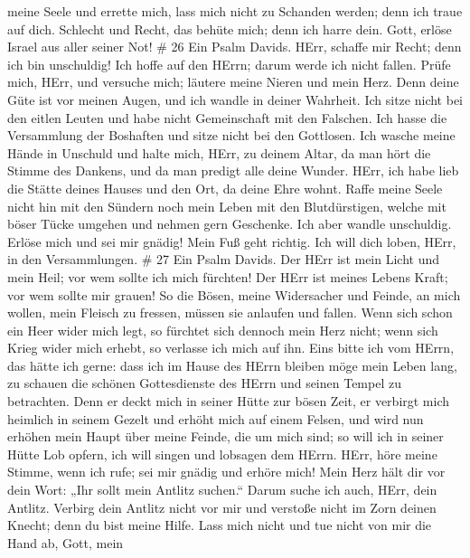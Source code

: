 meine Seele und errette mich, lass mich nicht zu Schanden werden; denn
ich traue auf dich.  Schlecht und Recht, das behüte mich;
denn ich harre dein.  Gott, erlöse Israel aus aller seiner
Not! \# 26  Ein Psalm Davids. HErr, schaffe mir Recht; denn
ich bin unschuldig! Ich hoffe auf den HErrn; darum werde ich nicht
fallen.  Prüfe mich, HErr, und versuche mich; läutere meine
Nieren und mein Herz.  Denn deine Güte ist vor meinen Augen,
und ich wandle in deiner Wahrheit.  Ich sitze nicht bei den
eitlen Leuten und habe nicht Gemeinschaft mit den Falschen. 
Ich hasse die Versammlung der Boshaften und sitze nicht bei den
Gottlosen.  Ich wasche meine Hände in Unschuld und halte
mich, HErr, zu deinem Altar,  da man hört die Stimme des
Dankens, und da man predigt alle deine Wunder.  HErr, ich
habe lieb die Stätte deines Hauses und den Ort, da deine Ehre wohnt.
 Raffe meine Seele nicht hin mit den Sündern noch mein Leben
mit den Blutdürstigen,  welche mit böser Tücke umgehen und
nehmen gern Geschenke.  Ich aber wandle unschuldig. Erlöse
mich und sei mir gnädig!  Mein Fuß geht richtig. Ich will
dich loben, HErr, in den Versammlungen. \# 27  Ein Psalm
Davids. Der HErr ist mein Licht und mein Heil; vor wem sollte ich mich
fürchten! Der HErr ist meines Lebens Kraft; vor wem sollte mir grauen!
 So die Bösen, meine Widersacher und Feinde, an mich wollen,
mein Fleisch zu fressen, müssen sie anlaufen und fallen. 
Wenn sich schon ein Heer wider mich legt, so fürchtet sich dennoch mein
Herz nicht; wenn sich Krieg wider mich erhebt, so verlasse ich mich auf
ihn.  Eins bitte ich vom HErrn, das hätte ich gerne: dass
ich im Hause des HErrn bleiben möge mein Leben lang, zu schauen die
schönen Gottesdienste des HErrn und seinen Tempel zu betrachten.
 Denn er deckt mich in seiner Hütte zur bösen Zeit, er
verbirgt mich heimlich in seinem Gezelt und erhöht mich auf einem
Felsen,  und wird nun erhöhen mein Haupt über meine Feinde,
die um mich sind; so will ich in seiner Hütte Lob opfern, ich will
singen und lobsagen dem HErrn.  HErr, höre meine Stimme,
wenn ich rufe; sei mir gnädig und erhöre mich!  Mein Herz
hält dir vor dein Wort: „Ihr sollt mein Antlitz suchen.`` Darum suche
ich auch, HErr, dein Antlitz.  Verbirg dein Antlitz nicht
vor mir und verstoße nicht im Zorn deinen Knecht; denn du bist meine
Hilfe. Lass mich nicht und tue nicht von mir die Hand ab, Gott, mein
